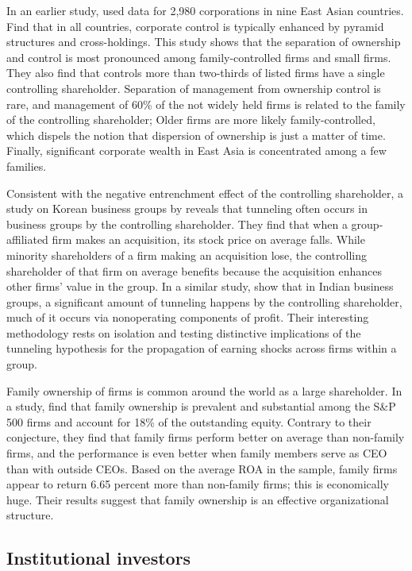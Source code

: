 \documentclass[final,1p,authoryear]{elsarticle}
\begin{document}
In an earlier study, \cite{CLAESSENS200081} used data for 2,980 corporations in nine East Asian countries. Find that in all countries, corporate control is typically enhanced by pyramid structures and cross-holdings. This study shows that the separation of ownership and control is most pronounced among family-controlled firms and small firms. They also find that controls more than two-thirds of listed firms have a single controlling shareholder. Separation of management from ownership control is rare, and management of 60\% of the not widely held firms is related to the family of the controlling shareholder; Older firms are more likely family-controlled, which dispels the notion that dispersion of ownership is just a matter of time. Finally, significant corporate wealth in East Asia is concentrated among a few families.

Consistent with the negative entrenchment effect of the controlling shareholder, a study on Korean business groups by \cite{doi:10.1111/1540-6261.00510} reveals that tunneling often occurs in business groups by the controlling shareholder. They find that when a group-affiliated firm makes an acquisition, its stock price on average falls. While minority shareholders of a firm making an acquisition lose, the controlling shareholder of that firm on average benefits because the acquisition enhances other firms' value in the group. In a similar study, \cite{RePEc:oup:qjecon:v:117:y:2002:i:1:p:121-148.} show that in Indian business groups, a significant amount of tunneling happens by the controlling shareholder, much of it occurs via nonoperating components of profit. Their interesting methodology rests on isolation and testing distinctive implications of the tunneling hypothesis for the propagation of earning shocks across firms within a group.

Family ownership of firms is common around the world as a large shareholder. In a study, \cite{doi:10.1111/1540-6261.00567} find that family ownership is prevalent and substantial among the S\&P 500 firms and account for 18\% of the outstanding equity. Contrary to their conjecture, they find that family firms perform better on average than non-family firms, and the performance is even better when family members serve as CEO than with outside CEOs. Based on the average ROA in the sample, family firms appear to return 6.65 percent more than non-family firms; this is economically huge. Their results suggest that family ownership is an effective organizational structure.

\subsection{Institutional investors}
\end{document}
